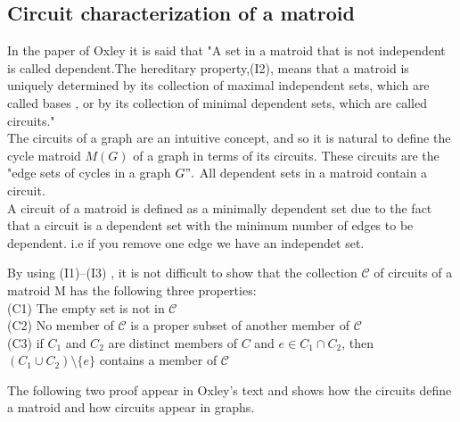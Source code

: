 \documentclass[../main.tex]{subfiles}
\begin{document}
\subsection{Circuit characterization of a matroid}
In the paper of Oxley \cite{ox_paper} it is said that "A set in a matroid that is not independent is called dependent.The hereditary property,(I2), means that a matroid is uniquely determined by its collection of maximal independent sets, which are called bases , or by its collection of minimal dependent sets, which are called circuits." \\
\indent The circuits of a graph are an intuitive concept, and so it is natural to define the cycle matroid $M(G)$ of a graph in terms of its circuits. These circuits are the "edge sets of cycles in a graph $G".$ All dependent sets in a matroid contain a circuit.\\
\indent A circuit of a matroid is defined as a minimally dependent set due to the fact that a circuit is a dependent set with the minimum number of edges to be dependent. i.e if you remove one edge we have an independet set.

\begin{defn} By using (I1)–(I3) , it is not difficult to show that the collection $\mathcal{C}$ of circuits of a matroid M has the following three properties:\\
(C1) The empty set is not in $\mathcal{C}$\\
(C2) No member of $\mathcal{C}$ is a proper subset of another member of $\mathcal{C}$\\
(C3) if $ C_1 $ and $ C_2 $ are distinct members of $ C $ and 
$ e \in C_1 \cap C_2 $, then $ (C_1 \cup C_2 ) \setminus \{e\} $ contains a member of $\mathcal{C}$ 
 \end{defn}
 
\noindent The following two proof appear in Oxley's text and shows how the circuits define a matroid and how circuits appear in graphs.\cite{ox_book}
\end{document}
